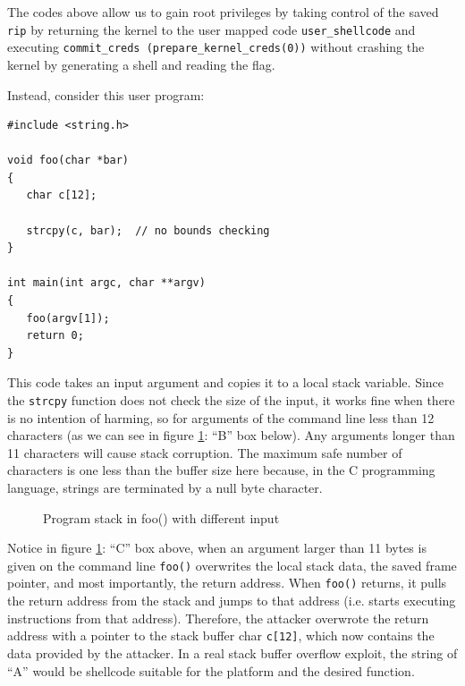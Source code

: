 \documentclass{masterthesis}
\begin{document}
The codes above allow us to gain root privileges by taking control of the saved \texttt{rip} by returning the kernel to the user mapped code \texttt{user_shellcode} and executing \texttt{commit_creds (prepare_kernel_creds(0))} without crashing the kernel by generating a shell and reading the flag.

Instead, consider this user program:
\begin{lstlisting}
#include <string.h>

void foo(char *bar)
{
   char c[12];

   strcpy(c, bar);  // no bounds checking
}

int main(int argc, char **argv)
{
   foo(argv[1]);
   return 0;
}
\end{lstlisting}
This code takes an input argument and copies it to a local stack variable. Since the \texttt{strcpy} function does not check the size of the input, it works fine when there is no intention of harming, so for arguments of the command line less than 12 characters (as we can see in figure \ref{figure:stackoverflow}: ``B'' box below). Any arguments longer than 11 characters will cause stack corruption. The maximum safe number of characters is one less than the buffer size here because, in the C programming language, strings are terminated by a null byte character. 

\begin{figure}[h!]
  \caption{Program stack in foo() with different input}
  \label{figure:stackoverflow}
   
\end{figure} 

Notice in figure \ref{figure:stackoverflow}: ``C'' box above, when an argument larger than 11 bytes is given on the command line \texttt{foo()} overwrites the local stack data, the saved frame pointer, and most importantly, the return address. When \texttt{foo()} returns, it pulls the return address from the stack and jumps to that address (i.e. starts executing instructions from that address). Therefore, the attacker overwrote the return address with a pointer to the stack buffer char \texttt{c[12]}, which now contains the data provided by the attacker. In a real stack buffer overflow exploit, the string of ``A'' would be shellcode suitable for the platform and the desired function.
\end{document}
